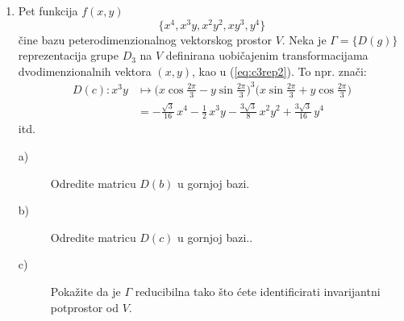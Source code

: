 \begin{enumerate}[label=\arabic{chapter}.\arabic*.]
\item
Pet funkcija $f(x,y)$
\[
    \{x^4, x^3y, x^2y^2, xy^3, y^4\}
\]
čine bazu peterodimenzionalnog vektorskog prostor $V$. Neka je $\Gamma=
\{D(g)\}$
reprezentacija grupe $D_3$ na $V$ definirana uobičajenim transformacijama
dvodimenzionalnih vektora $(x,y)$, kao u (\ref{eq:c3rep2}). To npr. znači:
\begin{align*}
   D(c): x^3y &\mapsto \bigg(x\cos\frac{2\pi}{3}-y\sin\frac{2\pi}{3}\bigg)^3
\bigg(x\sin\frac{2\pi}{3}+y\cos\frac{2\pi}{3}\bigg) \\
 &= -\frac{\sqrt{3}}{16} \,  x^{4}  - \frac{1}{2} \, x^{3} y
   - \frac{3\sqrt{3}}{8} \,  x^{2} y^{2} + \frac{3\sqrt{3}}{16} \,  y^{4}
\end{align*}
itd. 
\begin{description}
\item[a)] Odredite matricu $D(b)$ u gornjoj bazi. 
\item[b)] Odredite matricu $D(c)$ u gornjoj bazi.. 
\item[c)] Pokažite da je $\Gamma$ reducibilna tako što ćete identificirati
invarijantni potprostor od $V$.
\end{description}


\end{enumerate}
